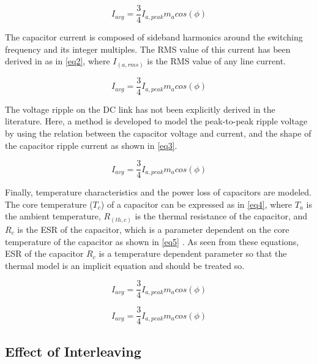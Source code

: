 \documentclass[conference,a4paper,twocolumn]{IEEEtran}
\begin{document}
\begin{equation}
\label{eq1}
I_{avg} = \frac{3}{4}I_{a,peak}m_acos(\phi)
\end{equation}


The capacitor current is composed of sideband harmonics around the switching frequency and its integer multiples. The RMS value of this current has been derived in \cite{Su2010,Bianchi2003} as in \ref{eq2}, where $I_(a,rms)$ is the RMS value of any line current.

\begin{equation}
\label{eq2}
I_{avg} = \frac{3}{4}I_{a,peak}m_acos(\phi)
\end{equation}


The voltage ripple on the DC link has not been explicitly derived in the literature. Here, a method is developed to model the peak-to-peak ripple voltage by using the relation between the capacitor voltage and current, and the shape of the capacitor ripple current as shown in \ref{eq3}.


\begin{equation}
\label{eq3}
I_{avg} = \frac{3}{4}I_{a,peak}m_acos(\phi)
\end{equation}


Finally, temperature characteristics and the power loss of capacitors are modeled. The core temperature ($T_c$) of a capacitor can be expressed as in \ref{eq4}, where $T_a$ is the ambient temperature, $R_(th,c)$ is the thermal resistance of the capacitor, and $R_c$ is the ESR of the capacitor, which is a parameter dependent on the core temperature of the capacitor as shown in \ref{eq5} \cite{Bianchi2003}. As seen from these equations, ESR of the capacitor $R_c$ is a temperature dependent parameter so that the thermal model is an implicit equation and should be treated so.


\begin{equation}
\label{eq4}
I_{avg} = \frac{3}{4}I_{a,peak}m_acos(\phi)
\end{equation}


\begin{equation}
\label{eq5}
I_{avg} = \frac{3}{4}I_{a,peak}m_acos(\phi)
\end{equation}





\subsection{Effect of Interleaving}
\end{document}
